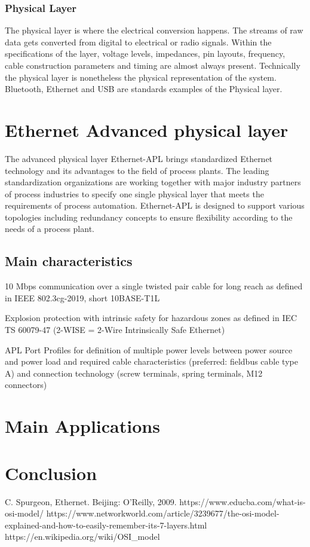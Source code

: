 \documentclass[conference]{IEEEtran}
\begin{document}
\subsubsection{Physical Layer}
The physical layer is where the electrical conversion happens. The streams of raw data gets converted from digital to electrical or radio signals. Within the specifications of the layer, voltage levels, impedances, pin layouts, frequency, cable construction parameters and timing are almost always present. Technically the physical layer is nonetheless the physical representation of the system. Bluetooth, Ethernet and USB are standards examples of the Physical layer.
\cite{b4}\cite{b5}
\section{Ethernet Advanced physical layer}
The advanced physical layer Ethernet-APL brings standardized Ethernet technology and its advantages to the field of process plants. The leading standardization organizations are working together with major industry partners of process industries to specify one single physical layer that meets the requirements of process automation. Ethernet-APL is designed to support various topologies including redundancy concepts to ensure flexibility according to the needs of a process plant.
\subsection{Main characteristics}
10 Mbps communication over a single twisted pair cable for long reach as defined in IEEE 802.3cg-2019, short 10BASE-T1L

Explosion protection with intrinsic safety for hazardous zones as defined in IEC TS 60079-47 (2-WISE = 2-Wire Intrinsically Safe Ethernet)

APL Port Profiles for definition of multiple power levels between power source and power load and required cable characteristics (preferred: fieldbus cable type A) and connection technology (screw terminals, spring terminals, M12 connectors)
\section{Main Applications}

\section{Conclusion}




\begin{thebibliography}{00}
 C. Spurgeon, Ethernet. Beijing: O'Reilly, 2009.
 https://www.educba.com/what-is-osi-model/
 https://www.networkworld.com/article/3239677/the-osi-model-explained-and-how-to-easily-remember-its-7-layers.html
 https://en.wikipedia.org/wiki/OSI_model
\end{thebibliography}
\end{document}
